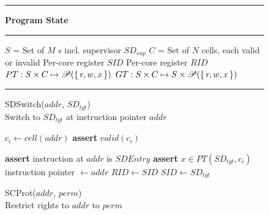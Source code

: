 \begin{figure*}[!t]
  \vspace{-1\baselineskip}
  \rule{\textwidth}{1pt}
  \centering
  \textbf{\seccells Program State\\}
  \vspace{-0.5\baselineskip}
  \rule{\textwidth}{1pt}
  \vspace{-2\baselineskip}
  \begin{multicols}{2}
    \begin{algorithmic}[1]
      \State $S$ = Set of $M$ \secdiv{}s incl. supervisor $SD_{sup}$
      \State $C$ = Set of $N$ cells, each valid or invalid
      \State Per-core register $SID$
      \State Per-core register $RID$
      \State \ptable $PT: S \times C \mapsto \mathscr{P}(\set{r, w, x})$
      \State \gtable $GT: S \times C \mapsto S \times \mathscr{P}(\set{r, w, x})$
    \end{algorithmic}
  \end{multicols}
  \vspace{-1.4\baselineskip}
  \rule{\textwidth}{1pt}

\vspace{-0.7\baselineskip}
\begin{multicols}{2}
\removelatexerror


    \begin{algorithm}[H]
      \caption{SDSwitch($addr$, $SD_{tgt}$) \\
        Switch to $SD_{tgt}$ at instruction pointer $addr$   }
        \begin{algorithmic}[1]

          \State $c_i \gets cell(addr)$
          \State \textbf{assert} $valid(c_i)$

          \State \textbf{assert} instruction at $addr$ is $SDEntry$
          \State \textbf{assert} $x \in PT(SD_{tgt}, c_i)$
          \State instruction pointer $\gets addr$
          \State $RID \gets SID$
          \State $SID \gets SD_{tgt}$
        \end{algorithmic}
        \label{alg:sdswitch}
    \end{algorithm}
    \vspace{-0.5\baselineskip}

    \begin{algorithm}[H]
      \caption{SCProt($addr$, $perm$) \\
      Restrict rights to $addr$ to $perm$              }
      \begin{algorithmic}[1]


\end{algorithmic}
\end{algorithm}
\end{multicols}
\end{figure*}
